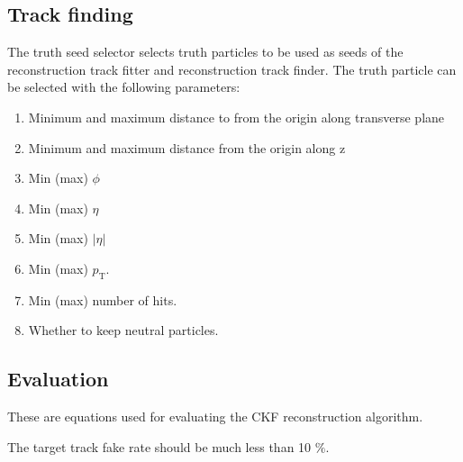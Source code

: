 \documentclass{article}
\newcommand{\pt}[0]{p_\textrm{T}}
\begin{document}

\subsection{Track finding}

The truth seed selector selects truth particles to be used as seeds of the reconstruction track fitter and reconstruction track finder. The truth particle can be selected with the following parameters:

\begin{enumerate}
\item Minimum and maximum distance to from the origin along transverse plane
\item Minimum and maximum distance from the origin along z
\item Min (max) $\phi$
\item Min (max) $\eta$
\item Min (max) $|\eta|$
\item Min (max) $\pt$.
\item Min (max) number of hits. 
\item Whether to keep neutral particles.
\end{enumerate}

\subsection{Evaluation}

These are equations used for evaluating the CKF reconstruction algorithm.






The target track fake rate should be much less than 10 $\%$.
\end{document}

